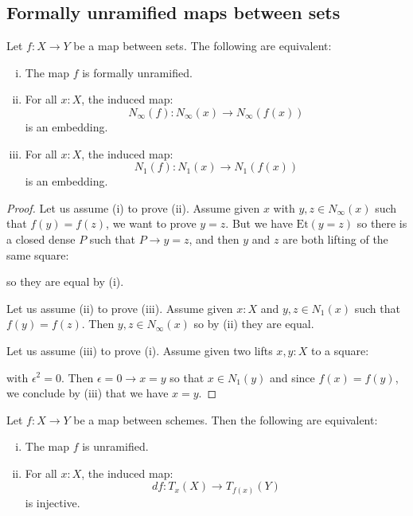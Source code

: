 \subsection{Formally unramified maps between sets}

\begin{proposition}\label{unramified-sets-map}
Let $f:X\to Y$ be a map between sets. The following are equivalent:
\begin{enumerate}[(i)]
\item The map $f$ is formally unramified.
\item For all $x:X$, the induced map:
\[N_\infty(f) : N_\infty(x)\to N_\infty(f(x))\]
is an embedding.
\item For all $x:X$, the induced map:
\[N_1(f) : N_1(x)\to N_1(f(x))\]
is an embedding.
\end{enumerate}
\end{proposition}

\begin{proof}
Let us assume (i) to prove (ii). Assume given $x$ with $y,z\in N_\infty(x)$ such that $f(y)=f(z)$, we want to prove $y=z$. But we have $\mathrm{Et}(y=z)$ so there is a closed dense $P$ such that $P\to y=z$, and then $y$ and $z$ are both lifting of the same square: 
 \begin{center}
    \end{center}
so they are equal by (i). 

Let us assume (ii) to prove (iii). Assume given $x:X$ and $y,z\in N_1(x)$ such that $f(y)=f(z)$. Then $y,z\in N_\infty(x)$ so by (ii) they are equal.

Let us assume (iii) to prove (i). Assume given two lifts $x,y:X$ to a square:
 \begin{center}
    \end{center}
    with $\epsilon^2=0$. Then $\epsilon=0 \to x=y$ so that $x\in N_1(y)$ and since $f(x)=f(y)$, we conclude by (iii) that we have $x=y$.
\end{proof}

\begin{corollary}\label{unramified-map-between-scheme-alt}
Let $f:X\to Y$ be a map between schemes. Then the following are equivalent:
\begin{enumerate}[(i)]
\item The map $f$ is unramified. 
\item For all $x:X$, the induced map:
\[df : T_x(X)\to T_{f(x)}(Y)\]
is injective.
\end{enumerate}
\end{corollary}

